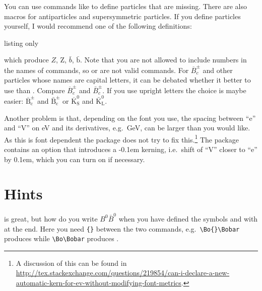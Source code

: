 You can use commands like  to define particles that are missing.
There are also macros for antiparticles and supersymmetric particles.
If you define particles yourself,
I would recommend one of the following definitions:
\begin{tcblisting}{listing only}
\newcommand*{\Zo}{\ensuremath{Z}\xspace}
\newcommand*{\Zo}{\ensuremath{\text{Z}}\xspace}
\newcommand*{\bbarQ}{\ensuremath{\bar{b}}\xspace}
\newcommand*{\bbarQ}{\ensuremath{\bar{\text{b}}}\xspace}
\end{tcblisting}
\noindent
which produce \ensuremath{Z}, \ensuremath{\text{Z}},
\ensuremath{\bar{b}}, \ensuremath{\bar{\text{b}}}. Note that you are
not allowed to include numbers in the names of commands, so
 or  are not valid commands. For
\(\overline{B}^{\pm}_{c}\) and other particles whose names are capital
letters, it can be debated whether it better to use
 than
. Compare \(\overline{B}^{\pm}_{c}\) and
\(\bar{B}^{\pm}_{c}\). If you use upright letters the choice is maybe
easier: \(\overline{\text{B}}^{\pm}_{\text{c}}\) and
\(\bar{\text{B}}^{\pm}_{\text{c}}\) or
\(\overline{\text{K}}^{0}_{\text{S}}\) and
\(\bar{\text{K}}^{0}_{\text{L}}\).

Another problem is that, depending on the font you use, the spacing between \enquote{e} and \enquote{V}
on \si{\eV} and its derivatives, e.g.\ \si{\GeV}, can be larger than you would like.
As this is font dependent the  package does not try to fix this.\footnote{%
A discussion of this can be found in
\url{http://tex.stackexchange.com/questions/219854/can-i-declare-a-new-automatic-kern-for-ev-without-modifying-font-metrics}.}
The  package contains an option  that introduces a -0.1em kerning,
i.e.\ shift of \enquote{V} closer to \enquote{e} by 0.1em, which you can turn on if necessary.


\section{Hints}%
\label{sec:tips:hints}

 is great, but how do you write \(B^{0}\bar{B}^{0}\) when
you have defined the symbols  and  with
 at the end. Here you need \verb+{}+ between the two
commands, e.g.\ \verb+\Bo{}\Bobar+ produces \Bo{}\Bobar while
\verb+\Bo\Bobar+ produces \Bo\Bobar.

